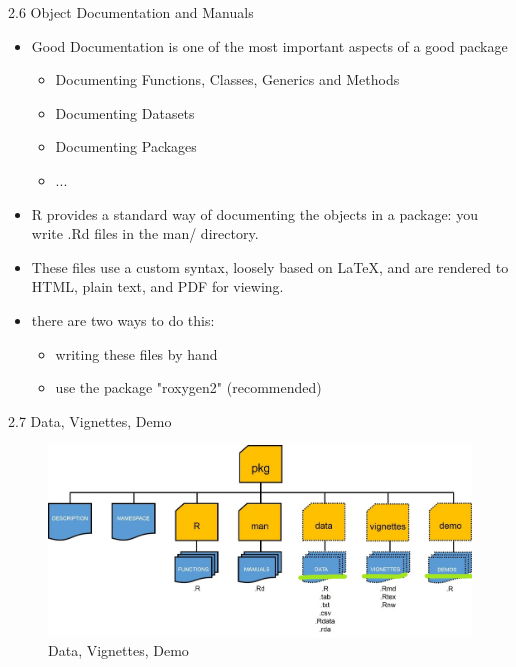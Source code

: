 \documentclass[11pt,a4paper]{beamer}
\begin{document}
\begin{frame}[t]{2.6 Object Documentation and Manuals}
	
	\begin{itemize}
		\item  Good Documentation	is	one	of	the	most	important	aspects	of	a	good package
		\begin{itemize}
			\item Documenting	Functions, 	Classes,	Generics and	Methods
			\item Documenting	Datasets
			\item Documenting	Packages
			\item ...
		\end{itemize}
		
		\item R	provides	a	standard	way	of	documenting	the	objects	in	a	package:	you	write	.Rd	files	in 	the	man/ directory.	
		\item 	These	files	use	a	custom	syntax,	loosely	based	on	LaTeX,	and	are
		rendered	to	HTML,	plain	text,	and	PDF	for	viewing.
		\item there are two ways to do this:
		\begin{itemize}
			\item writing	these	files	by	hand 
			\item use the package "roxygen2" (recommended)
		\end{itemize}
		
		
	\end{itemize}
	
\end{frame}











\begin{frame}[t]{2.7 Data, Vignettes, Demo}
	
	
	\begin{figure}
		\centering
		\includegraphics[width=0.9\linewidth]{opt}
		\caption{Data, Vignettes, Demo}
		\label{fig:packages}
	\end{figure}
	
	
\end{frame}
\end{document}
